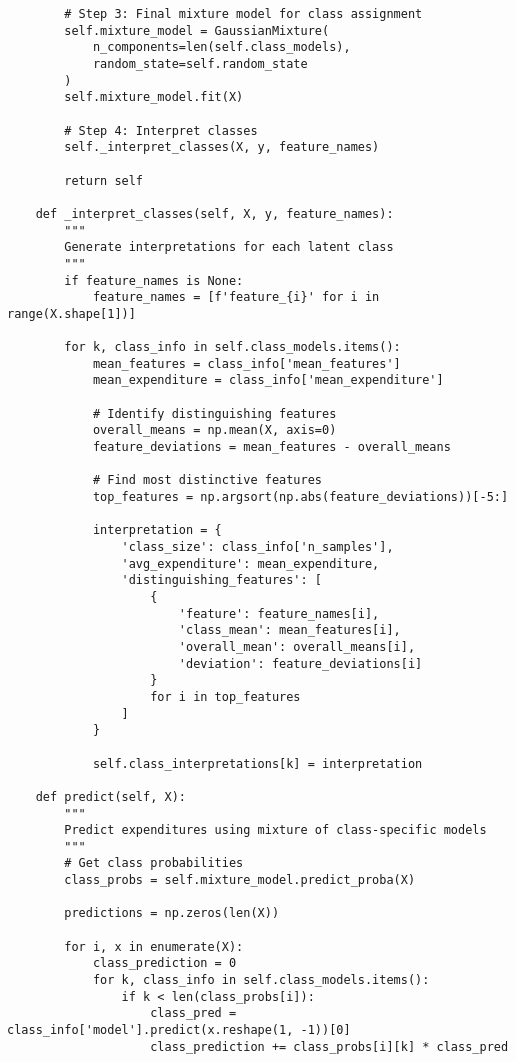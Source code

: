 \documentclass[12pt]{article}
\begin{document}
\begin{lstlisting}
        # Step 3: Final mixture model for class assignment
        self.mixture_model = GaussianMixture(
            n_components=len(self.class_models),
            random_state=self.random_state
        )
        self.mixture_model.fit(X)
        
        # Step 4: Interpret classes
        self._interpret_classes(X, y, feature_names)
        
        return self
    
    def _interpret_classes(self, X, y, feature_names):
        """
        Generate interpretations for each latent class
        """
        if feature_names is None:
            feature_names = [f'feature_{i}' for i in range(X.shape[1])]
        
        for k, class_info in self.class_models.items():
            mean_features = class_info['mean_features']
            mean_expenditure = class_info['mean_expenditure']
            
            # Identify distinguishing features
            overall_means = np.mean(X, axis=0)
            feature_deviations = mean_features - overall_means
            
            # Find most distinctive features
            top_features = np.argsort(np.abs(feature_deviations))[-5:]
            
            interpretation = {
                'class_size': class_info['n_samples'],
                'avg_expenditure': mean_expenditure,
                'distinguishing_features': [
                    {
                        'feature': feature_names[i],
                        'class_mean': mean_features[i],
                        'overall_mean': overall_means[i],
                        'deviation': feature_deviations[i]
                    }
                    for i in top_features
                ]
            }
            
            self.class_interpretations[k] = interpretation
    
    def predict(self, X):
        """
        Predict expenditures using mixture of class-specific models
        """
        # Get class probabilities
        class_probs = self.mixture_model.predict_proba(X)
        
        predictions = np.zeros(len(X))
        
        for i, x in enumerate(X):
            class_prediction = 0
            for k, class_info in self.class_models.items():
                if k < len(class_probs[i]):
                    class_pred = class_info['model'].predict(x.reshape(1, -1))[0]
                    class_prediction += class_probs[i][k] * class_pred
            

\end{lstlisting}
\end{document}
